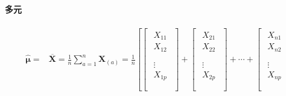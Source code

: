 \documentclass[12pt]{book}
\begin{document}
\paragraph{多元}

\begin{align*}
    \hat{\bm{\mu}}
    = & \overline{\mathbf{X}}
    =\frac{1}{n}\sum_{a=1}^{n}\mathbf{X}_{(a)}
    =\frac{1}{n}\left[\left[
            \begin{matrix}
                \begin{matrix}
                    X_{11} \\
                    X_{12} \\
                \end{matrix} \\
                \begin{matrix}
                    \vdots \\
                    X_{1p} \\
                \end{matrix} \\
            \end{matrix}\right]  +\left[
            \begin{matrix}
                \begin{matrix}
                    X_{21} \\
                    X_{22} \\
                \end{matrix} \\
                \begin{matrix}
                    \vdots \\
                    X_{2p} \\
                \end{matrix} \\
            \end{matrix}\right] +\cdots+ \left[
    \begin{matrix}
                \begin{matrix}
                    X_{n1} \\
                    X_{n2} \\
                \end{matrix} \\
                \begin{matrix}
                    \vdots \\
                    X_{np} \\
                \end{matrix} \\

\end{matrix}
\end{align*}
\end{document}
